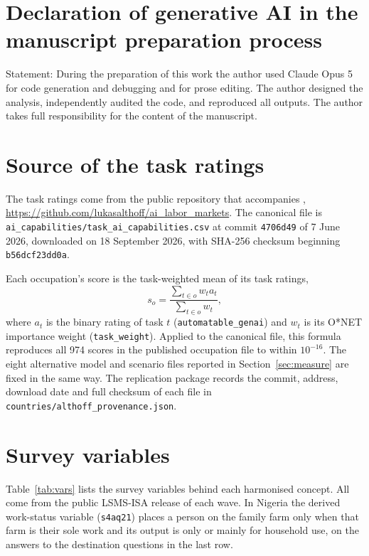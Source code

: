\section*{Declaration of generative AI in the
manuscript preparation process}

Statement: During the preparation of this work the author used Claude Opus 5
for code generation and debugging and for prose editing. The author designed
the analysis, independently audited the code, and reproduced all outputs. The
author takes full responsibility for the content of the manuscript.




\appendix
\section{Source of the task ratings}
\label{app:source}

\begin{sloppypar}
The task ratings come from the public repository that accompanies
\citet{althoff2026}, \url{https://github.com/lukasalthoff/ai_labor_markets}.
The canonical file is \nolinkurl{ai_capabilities/task_ai_capabilities.csv} at
commit \texttt{4706d49} of 7 June 2026, downloaded on 18 September 2026, with
SHA-256 checksum beginning \texttt{b56dcf23dd0a}.
\end{sloppypar}

Each occupation's score is the task-weighted mean of its task ratings,
\[
  s_o = \frac{\sum_{t \in o} w_t a_t}{\sum_{t \in o} w_t},
\]
where $a_t$ is the binary rating of task $t$ (\texttt{automatable\_genai}) and
$w_t$ is its O*NET importance weight (\texttt{task\_weight}). Applied to the
canonical file, this formula reproduces all 974 scores in the published
occupation file to within $10^{-16}$. The eight alternative model and scenario
files reported in Section~\ref{sec:measure} are fixed in the same way. The
replication package records the commit, address, download date and full
checksum of each file in \nolinkurl{countries/althoff_provenance.json}.

\section{Survey variables}
\label{app:vars}

Table~\ref{tab:vars} lists the survey variables behind each harmonised concept.
All come from the public LSMS-ISA release of each wave. In Nigeria the
derived work-status variable (\texttt{s4aq21}) places a person on the family
farm only when that farm is their sole work and its output is only or mainly
for household use, on the answers to the destination questions in the last row.

